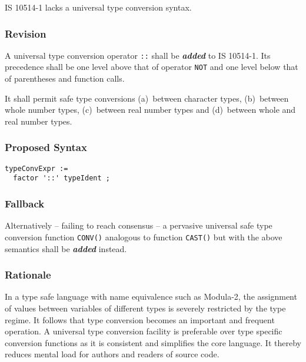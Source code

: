 \documentclass[10pt,a4paper,leqno,fleqn]{article}
\renewcommand{\emph}[1]{\textbf{\textit{#1}}}
\begin{document}
IS 10514-1 lacks a universal type conversion syntax.

\subsubsection{Revision}

A universal type conversion operator \verb|::| shall be \emph{added} to
IS 10514-1. Its precedence shall be one level above that of operator
\verb|NOT| and one level below that of parentheses and function calls.

It shall permit safe type conversions (a)~between character types,
(b)~between whole number types, (c)~between real number types and
(d)~between whole and real number types.


\subsubsection{Proposed Syntax}

\begin{verbatim}
typeConvExpr :=
  factor '::' typeIdent ;
\end{verbatim}

\subsubsection{Fallback}

Alternatively -- failing to reach consensus -- a pervasive universal safe type
conversion function \verb|CONV()| analogous to function \verb|CAST()| but
with the above semantics shall be \emph{added} instead.

\subsubsection{Rationale}

In a type safe language with name equivalence such as Modula-2, the
assignment of values between variables of different types is severely restricted
by the type regime. It follows that type conversion becomes an important and
frequent operation. A universal type conversion facility is preferable over type
specific conversion functions as it is consistent and simplifies the core language.
It thereby reduces mental load for authors and readers of source code.
\end{document}
